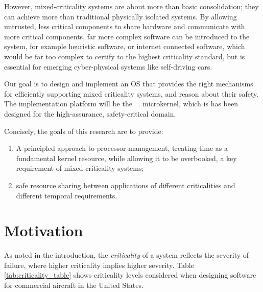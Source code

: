 However, mixed-criticality systems are about more than basic consolidation; they can achieve more
than traditional physically isolated systems. By allowing untrusted, less critical components to
share hardware and communicate with more critical components, far more complex software can be
introduced to the system, for example heuristic software, or internet connected software, 
which would be far too complex to certify to the highest criticality standard,
but is essential for emerging cyber-physical systems like self-driving cars.

Our goal is to design and implement an OS that provides the right mechanisms for efficiently
supporting mixed criticality systems, and reason about their safety.
The implementation platform will be the \selfour~\citep{Klein_EHACDEEKNSTW_09}.
microkernel, which is has been designed for the high-assurance, safety-critical domain.

Concisely, the goals of this research are to provide:
\begin{enumerate}[label=\textbf{G\arabic*}] 
    \item\label{G1} A principled approach to
    processor management, treating time as a fundamental kernel resource, while
    allowing it to be overbooked, a key requirement of mixed-criticality systems;
    \item safe resource sharing between applications of different criticalities and
    different temporal requirements.  
\end{enumerate}


\section{Motivation}

As noted in the introduction, the \emph{criticality} of a system reflects the
severity of failure, where higher criticality implies higher severity.  Table
\ref{tab:criticality_table} shows criticality levels considered when designing
software for commercial aircraft in the United States.

